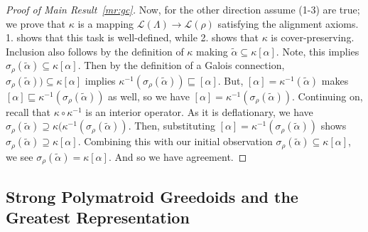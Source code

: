 \documentclass[11pt]{article}
\newcommand{\glang}{\Lambda}
\providecommand{\L}{}
\renewcommand{\L}{\mathscr{L}}
\begin{document}
\begin{proof}[Proof of Main Result~\ref{mr:gc}]
    Now, for the other direction assume (1-3) are true; we prove that $\kappa$ is a mapping $\L(\glang)\to\L(\rho)$ satisfying the alignment axioms.
    1. shows that this task is well-defined, while 2. shows that $\kappa$ is cover-preserving.
    Inclusion also follows by the definition of $\kappa$ making $\widetilde{\alpha}\subseteq\kappa[\alpha]$.
    Note, this implies $\sigma_\rho(\widetilde{\alpha}) \subseteq \kappa[\alpha]$.
    Then by the definition of a Galois connection, $\sigma_\rho(\widetilde{\alpha}))\subseteq \kappa[\alpha]$ implies $\kappa^{-1}(\sigma_\rho(\widetilde{\alpha}))\sqsubseteq [\alpha]$.
    But, $[\alpha] = \kappa^{-1}(\widetilde{\alpha})$ makes $[\alpha]\sqsubseteq \kappa^{-1}(\sigma_\rho(\widetilde{\alpha}))$ as well, so we have $[\alpha] = \kappa^{-1}(\sigma_{\rho}(\widetilde{\alpha}))$.
    Continuing on, recall that $\kappa\circ\kappa^{-1}$ is an interior operator.
    As it is deflationary, we have $\sigma_\rho(\widetilde{\alpha})\supseteq \kappa(\kappa^{-1}(\sigma_\rho(\widetilde{\alpha}))$.
    Then, substituting $[\alpha] = \kappa^{-1}(\sigma_{\rho}(\widetilde{\alpha}))$ shows $\sigma_\rho(\widetilde{\alpha})\supseteq  \kappa[\alpha]$.
    Combining this with our initial observation $\sigma_\rho(\widetilde{\alpha})\subseteq\kappa[\alpha]$, we see $\sigma_\rho(\widetilde{\alpha}) = \kappa[\alpha]$.
    And so we have agreement.
\end{proof}

\subsection{Strong Polymatroid Greedoids and the Greatest Representation}\label{subsec:lattice-embeddings}
\end{document}
